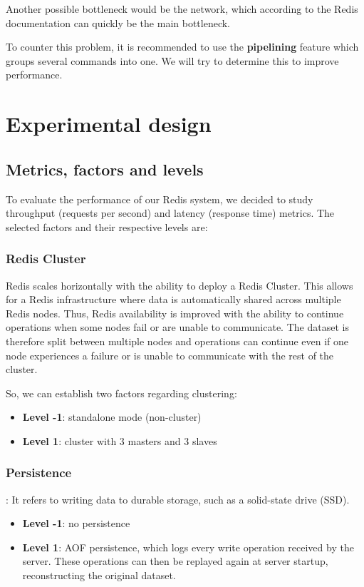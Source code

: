 \documentclass[runningheads]{llncs}
\begin{document}
Another possible bottleneck would be the network, which according to the Redis documentation can quickly be the main bottleneck.

To counter this problem, it is recommended to use the \textbf{pipelining} feature which groups several commands into one. We will try to determine this to improve performance.

\newpage
\section{Experimental design}
\subsection{Metrics, factors and levels}

To evaluate the performance of our Redis system, we decided to study throughput (requests per second) and latency (response time) metrics.
The selected factors and their respective levels are:

\subsubsection{Redis Cluster} Redis scales horizontally with the ability to deploy a Redis Cluster. This allows for a Redis infrastructure where data is automatically shared across multiple Redis nodes.
Thus, Redis availability is improved with the ability to continue operations when some nodes fail or are unable to communicate.
The dataset is therefore split between multiple nodes and operations can continue even if one node experiences a failure or is unable to communicate with the rest of the cluster.

So, we can establish two factors regarding clustering:
\begin{itemize}
    \item \textbf{Level -1}: standalone mode (non-cluster)
    \item \textbf{Level 1}: cluster with 3 masters and 3 slaves
\end{itemize}

\subsubsection{Persistence}: It refers to writing data to durable storage, such as a solid-state drive (SSD).
\begin{itemize}
    \item \textbf{Level -1}: no persistence
    \item \textbf{Level 1}: AOF persistence, which logs every write operation received by the server. These operations can then be replayed again at server startup, reconstructing the original dataset.
\end{itemize}
\end{document}
